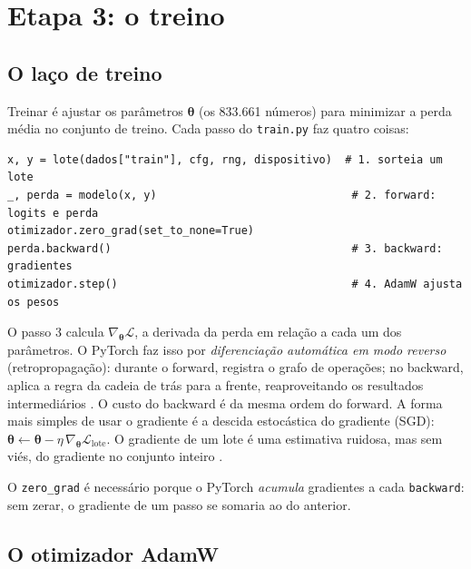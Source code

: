 \documentclass[11pt,a4paper]{article}
\begin{document}
\section{Etapa 3: o treino}
\label{sec:treino}

\subsection{O laço de treino}

Treinar é ajustar os parâmetros $\bm\theta$ (os 833.661 números) para minimizar a perda média no conjunto de treino. Cada passo do \texttt{train.py} faz quatro coisas:

\begin{lstlisting}
x, y = lote(dados["train"], cfg, rng, dispositivo)  # 1. sorteia um lote
_, perda = modelo(x, y)                              # 2. forward: logits e perda
otimizador.zero_grad(set_to_none=True)
perda.backward()                                     # 3. backward: gradientes
otimizador.step()                                    # 4. AdamW ajusta os pesos
\end{lstlisting}

\begin{teoria}
O passo 3 calcula $\nabla_{\bm\theta}\mathcal{L}$, a derivada da perda em relação a cada um dos parâmetros. O PyTorch faz isso por \emph{diferenciação automática em modo reverso} (retropropagação): durante o forward, registra o grafo de operações; no backward, aplica a regra da cadeia de trás para a frente, reaproveitando os resultados intermediários \cite[seção~6.5]{goodfellow}. O custo do backward é da mesma ordem do forward. A forma mais simples de usar o gradiente é a descida estocástica do gradiente (SGD): $\bm\theta \leftarrow \bm\theta - \eta\, \nabla_{\bm\theta}\mathcal{L}_{\text{lote}}$. O gradiente de um lote é uma estimativa ruidosa, mas sem viés, do gradiente no conjunto inteiro \cite[seção~8.3.1]{goodfellow}.
\end{teoria}

O \texttt{zero\_grad} é necessário porque o PyTorch \emph{acumula} gradientes a cada \texttt{backward}: sem zerar, o gradiente de um passo se somaria ao do anterior.

\subsection{O otimizador AdamW}
\end{document}
